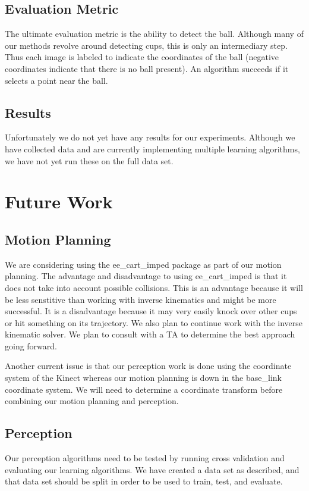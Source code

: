 \documentclass[letterpaper, 10 pt, conference]{ieeeconf}  %
\begin{document}
\subsection{Evaluation Metric}

The ultimate evaluation metric is the ability to detect the ball.  Although many of our methods revolve around detecting cups, this is only an intermediary step.  Thus each image is labeled to indicate the coordinates of the ball (negative coordinates indicate that there is no ball present).  An algorithm succeeds if it selects a point near the ball.

\subsection{Results}

Unfortunately we do not yet have any results for our experiments.  Although we have collected data and are currently implementing multiple learning algorithms, we have not yet run these on the full data set.


\section{Future Work}

\subsection{Motion Planning}
We are considering using the ee\_cart\_imped package as part of our motion planning. The advantage and disadvantage to using ee\_cart\_imped is that it does not take into account possible collisions. This is an advantage because it will be less senstitive than working with inverse kinematics and might be more successful. It is a disadvantage because it may very easily knock over other cups or hit something on its trajectory. We also plan to continue work with the inverse kinematic solver. We plan to consult with a TA to determine the best approach going forward.

Another current issue is that our perception work is done using the coordinate system of the Kinect whereas our motion planning is down in the base\_link coordinate system. We will need to determine a coordinate transform before combining our motion planning and perception.

\subsection{Perception}
Our perception algorithms need to be tested by running cross validation and evaluating our learning algorithms. We have created a data set as described, and that data set should be split in order to be used to train, test, and evaluate.
\end{document}
